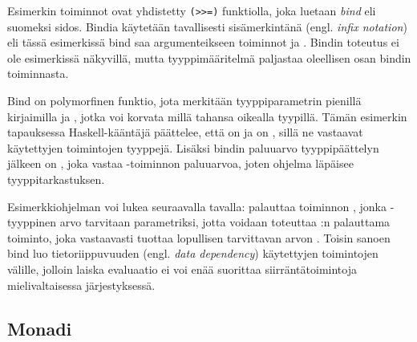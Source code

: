 \documentclass[finnish]{tktltiki2}
\begin{document}

Esimerkin toiminnot ovat yhdistetty \verb|(>>=)| funktiolla, joka luetaan \emph{bind} eli suomeksi
sidos. Bindia käytetään tavallisesti sisämerkintänä (engl. \emph{infix notation}) eli tässä esimerkissä
bind saa argumenteikseen toiminnot  ja . Bindin toteutus ei ole
esimerkissä näkyvillä, mutta tyyppimääritelmä paljastaa oleellisen osan bindin toiminnasta.

Bind on polymorfinen funktio, jota merkitään tyyppiparametrin pienillä kirjaimilla  ja
, jotka voi korvata millä tahansa oikealla tyypillä. Tämän esimerkin tapauksessa
Haskell-kääntäjä päättelee, että  on  ja  on \code{()}, sillä ne
vastaavat käytettyjen toimintojen tyyppejä. Lisäksi bindin paluuarvo tyyppipäättelyn jälkeen on
, joka vastaa -toiminnon paluuarvoa, joten ohjelma läpäisee
tyyppitarkastuksen.

Esimerkkiohjelman voi lukea seuraavalla tavalla:  palauttaa toiminnon ,
jonka -tyyppinen arvo tarvitaan parametriksi, jotta voidaan toteuttaa :n
palauttama toiminto, joka vastaavasti tuottaa lopullisen tarvittavan arvon . Toisin
sanoen bind luo tietoriippuvuuden (engl. \emph{data dependency}) käytettyjen toimintojen välille,
jolloin laiska evaluaatio ei voi enää suorittaa siirräntätoimintoja mielivaltaisessa järjestyksessä.

\subsection{Monadi}



\end{document}
